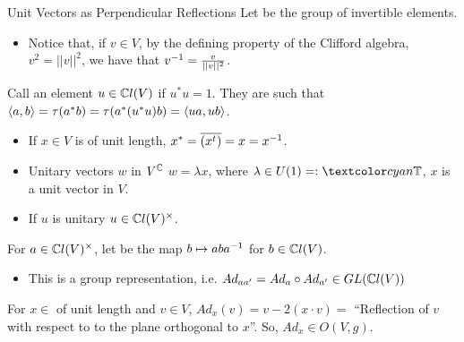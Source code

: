 \begin{frame}{Unit Vectors as Perpendicular Reflections} %
    Let  be the group of invertible elements.
        \begin{itemize}
            
        \item Notice that, if $v \in V$, by the defining property of the Clifford algebra, $v^2 = ||v||^2$, we have that $v^{-1} = \frac{v}{||v||^2}$.
            
        \end{itemize}
    
    Call an element $u \in \mathbb C l(V)$  if $u^* u = 1$. They are such that $\langle a, b \rangle = \tau(a^* b) = \tau(a^*(u^* u) b)  = \langle ua, ub \rangle$.
        \begin{itemize}
            
        \item If $x \in V$ is of unit length,  $x^* = \overline{(x^t)} = x = x^
        {-1}$.
        
        \item Unitary vectors $w$ in $V^\mathbb C$ \Iff $w = \lambda x$, where $\lambda \in U(1) =: \defn{\TT}$, $x$ is a unit vector in $V$.
        
        \item If $u$ is unitary \then $u \in \mathbb C l(V)^\times$.
            
        \end{itemize}
    

\end{frame}

\begin{frame} %

    For $a \in \mathbb C l(V)^\times$, let  be the map $b \mapsto a b a^{-1}$ for $b \in \mathbb C l(V)$. 
        \begin{itemize}
            
        \item This is a group representation, i.e. $Ad_{aa'} = Ad_a \circ Ad_{a'} \in GL(\mathbb C l(V))$ 
            
        \end{itemize}

    \begin{proposition}
    For $x \in $ of unit length and $v \in V$, $Ad_x(v) = v - 2 (x \cdot v) = $ ``Reflection of $v$ with respect to to the plane orthogonal to $x$''. So, $Ad_x \in O(V, g)$.
    \end{proposition}
    
    
    
\end{frame}

